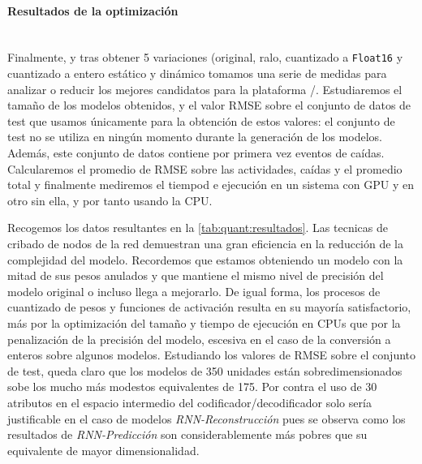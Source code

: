 \paragraph{Resultados de la optimización}\\
Finalmente, y tras obtener 5 variaciones (original, ralo, cuantizado a \texttt{Float16} y cuantizado a entero estático y dinámico tomamos una serie de medidas para analizar o reducir los mejores candidatos para la plataforma \ifell/. Estudiaremos el tamaño de los modelos obtenidos, y el valor RMSE sobre el conjunto de datos de test que usamos únicamente para la obtención de estos valores: el conjunto de test no se utiliza en ningún momento durante la generación de los modelos. Además, este conjunto de datos contiene por primera vez eventos de caídas. Calcularemos el promedio de RMSE sobre las actividades, caídas y el promedio total y finalmente mediremos el tiempod e ejecución en un sistema con GPU y en otro sin ella, y por tanto usando la CPU.

  Recogemos los datos resultantes en la \autoref{tab:quant:resultados}. Las tecnicas de cribado de nodos de la red demuestran una gran eficiencia en la reducción de la complejidad del modelo. Recordemos que estamos obteniendo un modelo con la mitad de sus pesos anulados y que mantiene el mismo nivel de precisión del modelo original o incluso llega a mejorarlo. De igual forma, los procesos de cuantizado de pesos y funciones de activación resulta en su mayoría satisfactorio, más por la optimización del tamaño y tiempo de ejecución en CPUs que por la penalización de la precisión del modelo, escesiva en el caso de la conversión a enteros sobre algunos modelos. Estudiando los valores de RMSE sobre el conjunto de test, queda claro que los modelos de 350 unidades están sobredimensionados sobe los mucho más modestos equivalentes de 175. Por contra el uso de 30 atributos en el espacio intermedio del codificador/decodificador solo sería justificable en el caso de modelos \textit{RNN-Reconstrucción} pues se observa como los resultados de \textit{RNN-Predicción} son considerablemente más pobres que su equivalente de mayor dimensionalidad.

